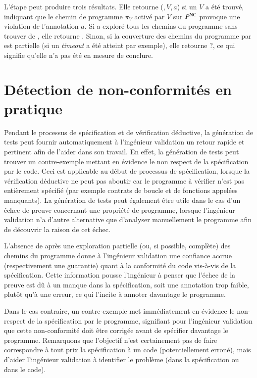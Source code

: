 L'étape \NCD peut produire trois résultats.
Elle retourne (\nc,\,$V$,\,$a$) si un \NCCE $V$ a été trouvé, indiquant que le
chemin de programme $\pi_V$ activé par $V$ sur $P^{\mathrm{NC}}$ provoque une violation
de l'annotation $a$.
Si \NCD a exploré tous les chemins du programme sans trouver de \NCCE, elle
retourne \no.
Sinon, si la couverture des chemins du programme par \NCD est partielle (si
un {\em timeout} a été atteint par exemple), elle retourne \textsf{?}, ce qui
signifie qu'elle n'a pas été en mesure de conclure.


\section{Détection de non-conformités en pratique}
\label{sec:ncd-scenarios}


Pendant le processus de spécification et de vérification déductive, la
génération de tests peut fournir automatiquement à l'ingénieur validation un
retour rapide et pertinent afin de l'aider dans son travail.
En effet, la génération de tests peut trouver un contre-exemple mettant en
évidence le non respect de la spécification par le code.
Ceci est applicable au début de processus de spécification, lorsque la
vérification déductive ne peut pas aboutir car le programme à vérifier n'est
pas entièrement spécifié (par exemple contrats de boucle et de fonctions
appelées manquants).
La génération de tests peut également être utile dans le cas d'un échec de
preuve concernant une propriété de programme, lorsque l'ingénieur validation
n'a d'autre alternative que d'analyser manuellement le programme afin de
découvrir la raison de cet échec.

L'absence de \NCCE après une exploration partielle (ou, si possible, complète)
des chemins du programme donne à l'ingénieur validation une confiance accrue
(respectivement une guarantie) quant à la conformité du code vis-à-vis de la
spécification.
Cette information pousse l'ingénieur à penser que l'échec de la preuve est dû à
un manque dans la spécification, soit une annotation trop faible, plutôt qu'à
une erreur, ce qui l'incite à annoter davantage le programme.

Dans le cas contraire, un contre-exemple met immédiatement en évidence le
non-respect de la spécification par le programme, signifiant pour l'ingénieur
validation que cette non-conformité doit être corrigée avant de spécifier
davantage le programme.
Remarquons que l'objectif n'est certainement pas de faire correspondre à tout
prix la spécification à un code (potentiellement erroné), mais d'aider
l'ingénieur validation à identifier le problème (dans la spécification ou dans
le code).

